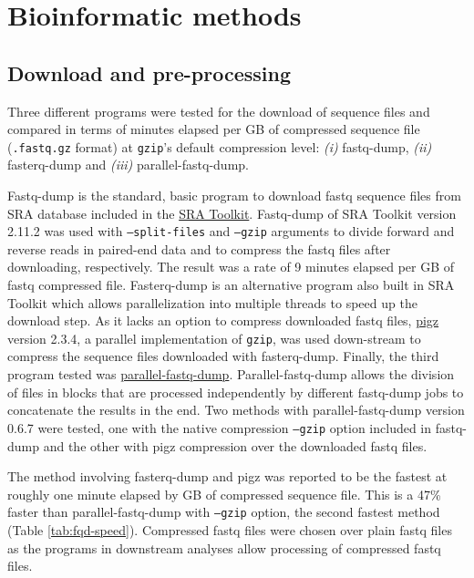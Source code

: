 \documentclass[
  openany]{book}
\begin{document}
\hypertarget{pilot-bioinf}{%
\section{Bioinformatic methods}\label{pilot-bioinf}}

\hypertarget{download-and-pre-processing}{%
\subsection{Download and pre-processing}\label{download-and-pre-processing}}

Three different programs were tested for the download of sequence files and compared in terms of minutes elapsed per GB of compressed sequence file (\texttt{.fastq.gz} format) at \texttt{gzip}'s default compression level: \emph{(i)} fastq-dump, \emph{(ii)} fasterq-dump and \emph{(iii)} parallel-fastq-dump.

Fastq-dump is the standard, basic program to download fastq sequence files from SRA database included in the \href{https://github.com/ncbi/sra-tools}{SRA Toolkit}. Fastq-dump of SRA Toolkit version 2.11.2 was used with \texttt{--split-files} and \texttt{--gzip} arguments to divide forward and reverse reads in paired-end data and to compress the fastq files after downloading, respectively. The result was a rate of 9 minutes elapsed per GB of fastq compressed file.
Fasterq-dump is an alternative program also built in SRA Toolkit which allows parallelization into multiple threads to speed up the download step. As it lacks an option to compress downloaded fastq files, \href{https://leimao.github.io/blog/Parallel-Gzip-Pigz/}{pigz} version 2.3.4, a parallel implementation of \texttt{gzip}, was used down-stream to compress the sequence files downloaded with fasterq-dump.
Finally, the third program tested was \href{https://github.com/rvalieris/parallel-fastq-dump}{parallel-fastq-dump}. Parallel-fastq-dump allows the division of files in blocks that are processed independently by different fastq-dump jobs to concatenate the results in the end. Two methods with parallel-fastq-dump version 0.6.7 were tested, one with the native compression \texttt{--gzip} option included in fastq-dump and the other with pigz compression over the downloaded fastq files.

The method involving fasterq-dump and pigz was reported to be the fastest at roughly one minute elapsed by GB of compressed sequence file. This is a 47\% faster than parallel-fastq-dump with \texttt{--gzip} option, the second fastest method (Table \ref{tab:fqd-speed}). Compressed fastq files were chosen over plain fastq files as the programs in downstream analyses allow processing of compressed fastq files.
\end{document}
